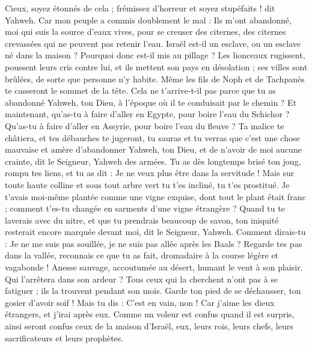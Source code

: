 \begin{multicols}{2}
Cieux, soyez étonnés de cela ; frémissez d'horreur et soyez stupéfaits ! dit Yahweh.
Car mon peuple a commis doublement le mal : Ils m'ont abandonné, moi qui suis la source d'eaux vives, pour se creuser des citernes, des citernes crevassées qui ne peuvent pas retenir l'eau.
Israël est-il un esclave, ou un esclave né dans la maison ? Pourquoi donc est-il mis au pillage ?
Les lionceaux rugissent, poussent leurs cris contre lui, et ils mettent son pays en désolation ; ses villes sont brûlées, de sorte que personne n'y habite.
Même les fils de Noph et de Tachpanès te casseront le sommet de la tête.
Cela ne t'arrive-t-il pas parce que tu as abandonné Yahweh, ton Dieu, à l'époque où il te conduisait par le chemin ?
Et maintenant, qu'as-tu à faire d'aller en Egypte, pour boire l'eau du Schichor ? Qu'as-tu à faire d'aller en Assyrie, pour boire l'eau du fleuve ?
Ta malice te châtiera, et tes débauches te jugeront, tu sauras et tu verras que c'est une chose mauvaise et amère d'abandonner Yahweh, ton Dieu, et de n'avoir de moi aucune crainte, dit le Seigneur, Yahweh des armées.
Tu as dès longtemps brisé ton joug, rompu tes liens, et tu as dit : Je ne veux plus être dans la servitude ! Mais sur toute haute colline et sous tout arbre vert tu t'es incliné, tu t'es prostitué.
Je t'avais moi-même plantée comme une vigne exquise, dont tout le plant était franc ; comment t'es-tu changée en sarments d'une vigne étrangère ?
Quand tu te laverais avec du nitre, et que tu prendrais beaucoup de savon, ton iniquité resterait encore marquée devant moi, dit le Seigneur, Yahweh.
Comment dirais-tu : Je ne me suis pas souillée, je ne suis pas allée après les Baals ? Regarde tes pas dans la vallée, reconnais ce que tu as fait, dromadaire à la course légère et vagabonde !
Anesse sauvage, accoutumée au désert, humant le vent à son plaisir. Qui l'arrêtera dans son ardeur ? Tous ceux qui la cherchent n'ont pas à se fatiguer ; ils la trouvent pendant son mois.
Garde ton pied de se déchausser, ton gosier d'avoir soif ! Mais tu dis : C'est en vain, non ! Car j'aime les dieux étrangers, et j'irai après eux.
Comme un voleur est confus quand il est surpris, ainsi seront confus ceux de la maison d'Israël, eux, leurs rois, leurs chefs, leurs sacrificateurs et leurs prophètes.

\end{multicols}
